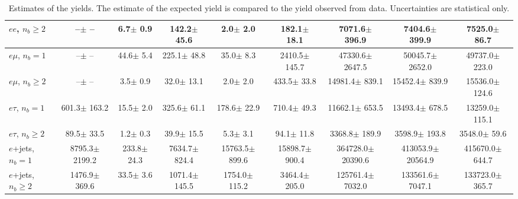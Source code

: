 \begin{sidewaystable}[p]
\begin{tabular}{l|cccccc|cc}
    $e e$, $n_b\geq2$                  &       --$\pm$     -- &      6.7$\pm$    0.9 &    142.2$\pm$   45.6 &      2.0$\pm$    2.0 &    182.1$\pm$   18.1 &   7071.6$\pm$  396.9 &   7404.6$\pm$  399.9 &   7525.0$\pm$   86.7 \\ 
    \hline
    $e\mu$, $n_b=1$                    &       --$\pm$     -- &     44.6$\pm$    5.4 &    225.1$\pm$   48.8 &     35.0$\pm$    8.3 &   2410.5$\pm$  145.7 &  47330.6$\pm$ 2647.5 &  50045.7$\pm$ 2652.0 &  49737.0$\pm$  223.0 \\ 
    $e\mu$, $n_b\geq2$                 &       --$\pm$     -- &      3.5$\pm$    0.9 &     32.0$\pm$   13.1 &      2.0$\pm$    2.0 &    433.5$\pm$   33.8 &  14981.4$\pm$  839.1 &  15452.4$\pm$  839.9 &  15536.0$\pm$  124.6 \\ 
    \hline
    $e\tau$, $n_b=1$                   &    601.3$\pm$  163.2 &     15.5$\pm$    2.0 &    325.6$\pm$   61.1 &    178.6$\pm$   22.9 &    710.4$\pm$   49.3 &  11662.1$\pm$  653.5 &  13493.4$\pm$  678.5 &  13259.0$\pm$  115.1 \\ 
    $e\tau$, $n_b\geq2$                &     89.5$\pm$   33.5 &      1.2$\pm$    0.3 &     39.9$\pm$   15.5 &      5.3$\pm$    3.1 &     94.1$\pm$   11.8 &   3368.8$\pm$  189.9 &   3598.9$\pm$  193.8 &   3548.0$\pm$   59.6 \\ 
    \hline
    $e$+jets, $n_b=1$                  &   8795.3$\pm$ 2199.2 &    233.8$\pm$   24.3 &   7634.7$\pm$  824.4 &  15763.5$\pm$  899.6 &  15898.7$\pm$  900.4 & 364728.0$\pm$20390.6 & 413053.9$\pm$20564.9 & 415670.0$\pm$  644.7 \\ 
    $e$+jets, $n_b\geq2$               &   1476.9$\pm$  369.6 &     33.5$\pm$    3.6 &   1071.4$\pm$  145.5 &   1754.0$\pm$  115.2 &   3464.4$\pm$  205.0 & 125761.4$\pm$ 7032.0 & 133561.6$\pm$ 7047.1 & 133723.0$\pm$  365.7 \\ 
    \hline

    \end{tabular}
    \caption{Estimates of the yields. The estimate of the expected yield is compared to
    the yield observed from data.  Uncertainties are statistical only.
    \label{tab:yields}}
\end{sidewaystable}
